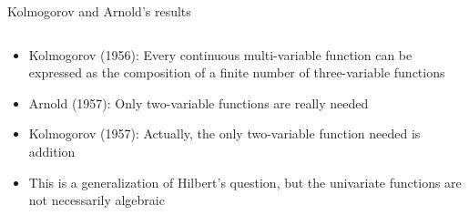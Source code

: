 \begin{frame}{Kolmogorov and Arnold's results}

\begin{columns}

  \begin{column}{7cm}
  \begin{itemize}
  \item Kolmogorov (1956): Every continuous multi-variable function
    can be expressed as the composition of a finite number of
    three-variable functions \vspace{0.3em}
  \item Arnold (1957): Only two-variable functions are really needed \vspace{0.3em}
  \item Kolmogorov (1957): Actually, the only two-variable function
    needed is addition \vspace{0.3em}
  \item This is a generalization of Hilbert's question, but the
    univariate functions are not necessarily algebraic
  \end{itemize}
  \end{column}


\end{columns}
\end{frame}

